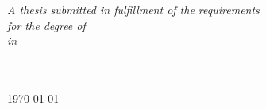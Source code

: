 \begin{titlepage}
\begin{center}
		\vfill

		\large \textit{A thesis submitted in fulfillment of the requirements\\ for the degree of \degreename}\\[0.3cm] %
		\textit{in }\\[0.4cm]
		\groupname\\\deptname\\[2cm] %

		\vfill

		{\large \today}\\[4cm] %

		\vfill
	\end{center}
\end{titlepage}